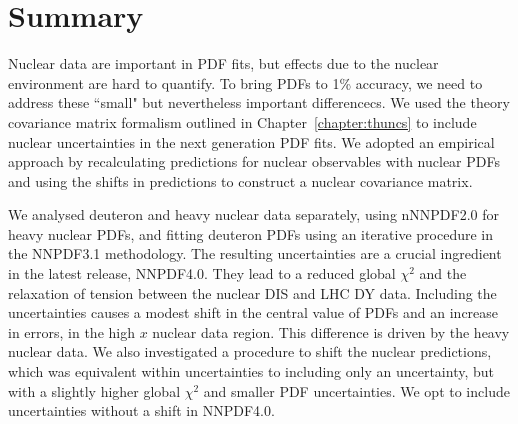 \section{Summary}
Nuclear data are important in PDF fits, but effects due to the nuclear environment are hard to quantify. To bring PDFs to 1\% accuracy, we need  to address these ``small" but nevertheless important differencecs. We used the theory covariance matrix formalism outlined in Chapter~\ref{chapter:thuncs} to include nuclear uncertainties in the next generation PDF fits. We adopted an empirical approach by recalculating predictions for nuclear observables with nuclear PDFs and using the shifts in predictions to construct a nuclear covariance matrix. 

We analysed deuteron and heavy nuclear data separately, using nNNPDF2.0 for heavy nuclear PDFs, and fitting deuteron PDFs using an iterative procedure in the NNPDF3.1 methodology. The resulting uncertainties are a crucial ingredient in the latest release, NNPDF4.0. They lead to a reduced global $\chi^2$ and the relaxation of tension between the nuclear DIS and LHC DY data. Including the uncertainties causes a modest shift in the central value of PDFs and an increase in errors, in the high $x$ nuclear data region. This difference is driven by the heavy nuclear data. We also investigated a procedure to shift the nuclear predictions, which was equivalent within uncertainties to including only an uncertainty, but with a slightly higher global $\chi^2$ and smaller PDF uncertainties. We opt to include uncertainties without a shift in NNPDF4.0.


\label{sec:summandoutlook}

